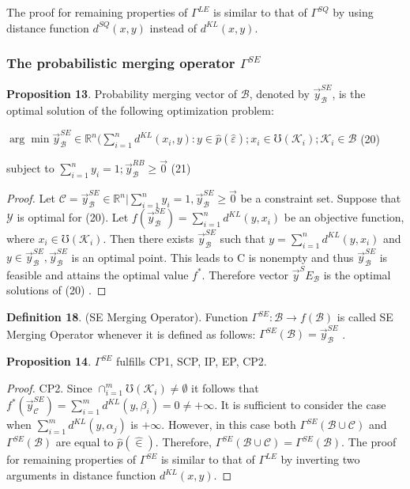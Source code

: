 \documentclass[]{iosart2c}
\begin{document}
  The proof for remaining properties of $\Gamma^{LE}$ is similar to that of
  $\Gamma^{SQ}$ by using distance function $d^{SQ}(x, y)$
  instead of $d^{KL}(x, y)$.

  \subsubsection{The probabilistic merging operator $\Gamma^{SE}$}

  \textbf{Proposition 13}. Probability merging vector of $\mathcal{B}$,
  denoted by $\vec{y}^{SE}_\mathcal{B}$, is the optimal solution of the following optimization problem:

  $\arg \min\vec{y}^{SE}_\mathcal{B} \in \mathbb{R}^n (
  \sum^n_{i=1} d^{KL}(x_i, y) :
  y \in \hat{p}(\hat{\varepsilon}); x_i \in \mho(\mathcal{K}_i);\mathcal{K}_i \in \mathcal{B}$ (20)

  subject to $\sum^n_{i=1} y_i = 1; \vec{y}^{RB}_\mathcal{B}\geq\vec{0}$ (21)
  \begin{proof}
    Let $\mathcal{C} = {\vec{y}^{SE}_\mathcal{B} \in \mathbb{R}^n|\sum^n_{i=1} y_i = 1, \vec{y}^{SE}_\mathcal{B}\geq\vec{0}}$
    be a constraint set. Suppose that $\mathcal{Y}$ is optimal for
    (20). Let $f(\vec{y}^{SE}_\mathcal{B})= \sum^n_{i=1} d^{KL}(y, x_i)$ be an objective function,
    where $x_i \in \mho(\mathcal{K}_i)$. Then there exists $\vec{y}^{SE}_\mathcal{B}$
    such that $y = \sum^n_{i=1} d^{KL}(y, x_i)$ and $y \in \vec{y}^{SE}_\mathcal{B} ,\vec{y}^{SE}_\mathcal{B}$ is
    an optimal point. This leads to C is nonempty and
    thus $\vec{y}^{SE}_\mathcal{B}$ is feasible and attains the optimal value $f^*$.
    Therefore vector $\vec{y}^SE_\mathcal{B}$ is the optimal solutions of (20)
    \cite{25}.
  \end{proof}


  \textbf{Definition 18}. (SE Merging Operator). Function
  $\Gamma^{SE} : \mathcal{B} \to f(\mathcal{B})$ is called SE Merging Operator
  whenever it is defined as follows:
  $\Gamma^{SE}(\mathcal{B}) = \vec{y}^{SE}_\mathcal{B}$ .

  \textbf{Proposition 14}.
  $\Gamma^{SE}$ fulfills CP1, SCP, IP, EP, CP2.

  \begin{proof}
    CP2. Since $\cap^m_{i=1}\mho(\mathcal{K}_i) \neq \emptyset$ it follows that
    $f^*(\vec{y}^{SE}_\mathcal{C} ) = \sum^m_{i=1} d^{KL}(y, \beta_i) = 0 \neq +\infty$. It is sufficient
    to consider the case when $\sum^m_{i=1} d^{KL}(y, \alpha_j)$
    is $+\infty$. However, in this case both $\Gamma^{SE}(\mathcal{B} \cup \mathcal{C})$ and
    $\Gamma^{SE}(\mathcal{B})$ are equal to $\hat{p}(\hat{\in})$. Therefore, $\Gamma^{SE}(\mathcal{B} \cup \mathcal{C}) =
    \Gamma^{SE}(\mathcal{B})$. The proof for remaining properties of $\Gamma^{SE}$
    is similar to that of $\Gamma^{LE}$ by inverting two arguments
    in distance function $d^{KL}(x, y)$.
  \end{proof}
\end{document}

